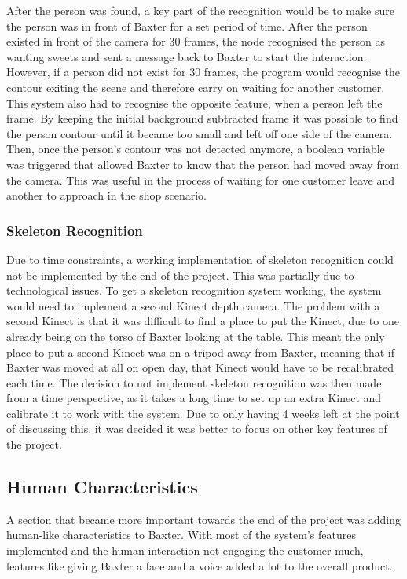 After the person was found, a key part of the recognition would be to make sure the person was in front of Baxter for a set period of time. After the person existed in front of the camera for 30 frames, the node recognised the person as wanting sweets and sent a message back to Baxter to start the interaction. However, if a person did not exist for 30 frames, the program would recognise the contour exiting the scene and therefore carry on waiting for another customer.
\newline\newline
This system also had to recognise the opposite feature, when a person left the frame. By keeping the initial background subtracted frame it was possible to find the person contour until it became too small and left off one side of the camera. Then, once the person's contour was not detected anymore, a boolean variable was triggered that allowed Baxter to know that the person had moved away from the camera. This was useful in the process of waiting for one customer leave and another to approach in the shop scenario.
\subsubsection{Skeleton Recognition}
Due to time constraints, a working implementation of skeleton recognition could not be implemented by the end of the project. This was partially due to technological issues. To get a skeleton recognition system working, the system would need to implement a second Kinect depth camera. The problem with a second Kinect is that it was difficult to find a place to put the Kinect, due to one already being on the torso of Baxter looking at the table. This meant the only place to put a second Kinect was on a tripod away from Baxter, meaning that if Baxter was moved at all on open day, that Kinect would have to be recalibrated each time. The decision to not implement skeleton recognition was then made from a time perspective, as it takes a long time to set up an extra Kinect and calibrate it to work with the system. Due to only having 4 weeks left at the point of discussing this, it was decided it was better to focus on other key features of the project.
\subsection{Human Characteristics}
A section that became more important towards the end of the project was adding human-like characteristics to Baxter. With most of the system's features implemented and the human interaction not engaging the customer much, features like giving Baxter a face and a voice added a lot to the overall product.
